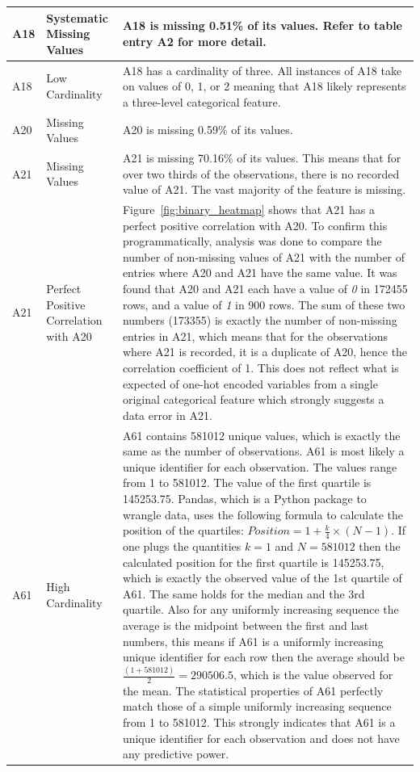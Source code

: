 \documentclass[11pt]{report}
\begin{document}
\begin{longtable}{lp{4cm}p{7cm}}
\midrule
A18 & Systematic Missing Values & A18 is missing 0.51\% of its values.  Refer to table entry A2 for more detail. \\
\midrule
A18 & Low Cardinality & A18 has a cardinality of three. All instances of A18 take on values of 0, 1, or 2 meaning that A18 likely represents a three-level categorical feature. \\
\midrule
A20 & Missing Values & A20 is missing 0.59\% of its values. \\
\midrule
A21 & Missing Values & A21 is missing 70.16\% of its values. This means that for over two thirds of the observations, there is no recorded value of A21. The vast majority of the feature is missing. \\
\midrule
A21 & Perfect Positive Correlation with A20 & Figure~\ref{fig:binary_heatmap} shows that A21 has a perfect positive correlation with A20. To confirm this programmatically, analysis was done to compare the number of non-missing values of A21 with the number of entries where A20 and A21 have the same value. It was found that A20 and A21 each have a value of \textit{0} in 172455 rows, and a value of \textit{1} in 900 rows. The sum of these two numbers (173355) is exactly the number of non-missing entries in A21, which means that for the observations where A21 is recorded, it is a duplicate of A20, hence the correlation coefficient of 1. This does not reflect what is expected of one-hot encoded variables from a single original categorical feature which strongly suggests a data error in A21. \\
\midrule
A61 & High Cardinality & A61 contains 581012 unique values, which is exactly the same as the number of observations. A61 is most likely a unique identifier for each observation. The values range from 1 to 581012. The value of the first quartile is 145253.75. Pandas, which is a Python package to wrangle data, uses the following formula to calculate the position of the quartiles: $Position = 1 + \frac{k}{4} \times (N - 1)$. If one plugs the quantities $k = 1$ and $N = 581012$ then the calculated position for the first quartile is 145253.75, which is exactly the observed value of the 1st quartile of A61. The same holds for the median and the 3rd quartile. Also for any uniformly increasing sequence the average is the midpoint between the first and last numbers, this means if A61 is a uniformly increasing unique identifier for each row then the average should be $\frac{(1 + 581012)}{2} = 290506.5$, which is the value observed for the mean. The statistical properties of A61 perfectly match those of a simple uniformly increasing sequence from 1 to 581012. This strongly indicates that A61 is a unique identifier for each observation and does not have any predictive power. \\

\end{longtable}
\end{document}
